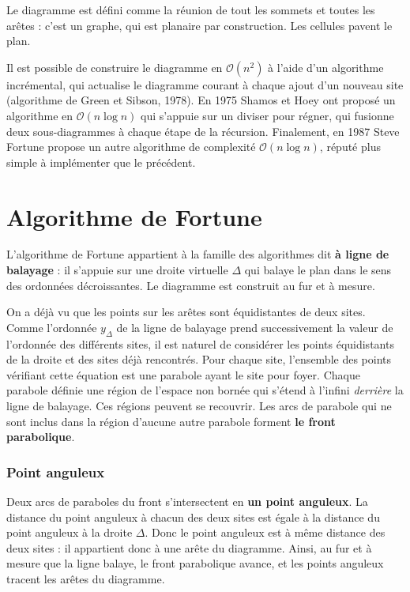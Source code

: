 \documentclass[a4paper, 10pt]{article}
\begin{document}
Le diagramme est défini comme la réunion de tout les sommets et toutes les arêtes : c'est un graphe, qui est planaire par construction. Les cellules pavent le plan.  
  
Il est possible de construire le diagramme en $\mathcal{O}(n^2)$ à l'aide d'un algorithme incrémental, qui actualise le diagramme courant à chaque ajout d'un nouveau site (algorithme de Green et Sibson, 1978). En 1975 Shamos et Hoey ont proposé un algorithme en $\mathcal{O}(n\log{n})$ qui s'appuie sur un diviser pour régner, qui fusionne deux sous-diagrammes à chaque étape de la récursion. Finalement, en 1987 Steve Fortune propose un autre algorithme de complexité $\mathcal{O}(n\log{n})$, réputé plus simple à implémenter que le précédent.  
\section{Algorithme de Fortune}  
L'algorithme de Fortune appartient à la famille des algorithmes dit \textbf{à ligne de balayage} : il s'appuie sur une droite virtuelle $\Delta$ qui balaye le plan dans le sens des ordonnées décroissantes. Le diagramme est construit au fur et à mesure.  
  
On a déjà vu que les points sur les arêtes sont équidistantes de deux sites. Comme l'ordonnée $y_{\Delta}$ de la ligne de balayage prend successivement la valeur de l'ordonnée des différents sites, il est naturel de considérer les points équidistants de la droite et des sites déjà rencontrés.  
Pour chaque site, l'ensemble des points vérifiant cette équation est une parabole ayant le site pour foyer. Chaque parabole définie une région de l'espace non bornée qui s'étend à l'infini \textit{derrière} la ligne de balayage. Ces régions peuvent se recouvrir. Les arcs de parabole qui ne sont inclus dans la région d'aucune autre parabole forment \textbf{le front parabolique}.  
  
\subsubsection{Point anguleux}
  
Deux arcs de paraboles du front s'intersectent en \textbf{un point anguleux}. La distance du point anguleux à chacun des deux sites est égale à la distance du point anguleux à la droite $\Delta$. Donc le point anguleux est à même distance des deux sites : il appartient donc à une arête du diagramme. Ainsi, au fur et à mesure que la ligne balaye, le front parabolique avance, et les points anguleux tracent les arêtes du diagramme.  
  
\end{document}
